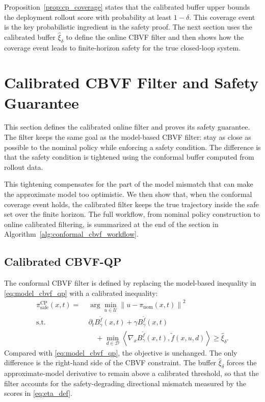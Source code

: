 \documentclass[letterpaper,10pt,conference]{ieeeconf}
\newcommand{\Bm}{B_{\gamma}^{\tilde f}}
\newcommand{\fapp}{\widetilde{f}}
\newcommand{\xv}{x}
\newcommand{\uv}{u}
\newcommand{\dv}{d}
\newcommand{\Uv}{\mathcal{U}}
\newcommand{\Dv}{\mathcal{D}}
\newcommand{\norm}[1]{\left\lVert #1 \right\rVert}
\newcommand{\ip}[2]{\left\langle #1,#2 \right\rangle}
\begin{document}
Proposition~\ref{prop:cp_coverage} states that the calibrated buffer upper
bounds the deployment rollout score with probability at least $1-\delta$. This
coverage event is the key probabilistic ingredient in the safety proof. The
next section uses the calibrated buffer $\widehat\xi_{\delta}$ to define the
online CBVF filter and then shows how the coverage event leads to
finite-horizon safety for the true closed-loop system.

\section{Calibrated CBVF Filter and Safety Guarantee}
\label{sec:calibrated_filter_safety}

This section defines the calibrated online filter and proves its safety
guarantee. The filter keeps the same goal as the model-based CBVF filter: stay
as close as possible to the nominal policy while enforcing a safety condition.
The difference is that the safety condition is tightened using the conformal
buffer computed from rollout data.

This tightening compensates for the part of the model mismatch that can make
the approximate model too optimistic. We then show that, when the conformal
coverage event holds, the calibrated filter keeps the true trajectory inside
the safe set over the finite horizon. The full workflow, from nominal policy
construction to online calibrated filtering, is summarized at the end of the
section in Algorithm~\ref{alg:conformal_cbvf_workflow}.

\subsection{Calibrated CBVF-QP}

The conformal CBVF filter is defined by replacing the model-based inequality in
\eqref{eq:model_cbvf_qp} with a calibrated inequality:
\begin{equation}
\begin{aligned}
    \pi_{\mathrm{safe}}^{\mathrm{CP}}(\xv,t)
    =\;& \arg\min_{\uv\in\Uv}
    \norm{\uv-\pi_{\mathrm{nom}}(\xv,t)}^2 \\
    \text{s.t.}\;&
    \partial_t \Bm(\xv,t)
    + \gamma \Bm(\xv,t) \\
    &\quad+
    \min_{\dv\in\Dv}
    \ip{\nabla_{\xv}\Bm(\xv,t)}
    {\fapp(\xv,\uv,\dv)}
    \ge \widehat\xi_{\delta}.
\end{aligned}
\label{eq:cp_filter}
\end{equation}
Compared with \eqref{eq:model_cbvf_qp}, the objective is unchanged. The only
difference is the right-hand side of the CBVF constraint. The buffer
$\widehat\xi_\delta$ forces the approximate-model derivative to remain above a
calibrated threshold, so that the filter accounts for the safety-degrading
directional mismatch measured by the scores in \eqref{eq:eta_def}.
\end{document}
